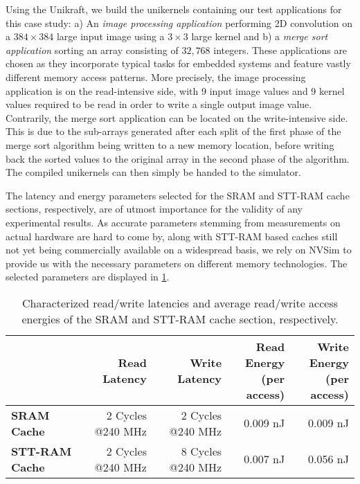 \par
Using the Unikraft, we build the unikernels containing our test applications for this case study:
a) An \emph{image processing application} performing 2D convolution on a $384 \times 384$ large input image using a $3 \times 3$ large kernel and
b) a \emph{merge sort application} sorting an array consisting of $32,768$ integers.
These applications are chosen as they incorporate typical tasks for embedded systems and feature vastly different memory access patterns.
More precisely, the image processing application is on the read-intensive side, with 9 input image values and 9 kernel values required to be read in order to write a single output image value.
Contrarily, the merge sort application can be located on the write-intensive side.
This is due to the sub-arrays generated after each split of the first phase of the merge sort algorithm being written to a new memory location, before writing back the sorted values to the original array in the second phase of the algorithm.
The compiled unikernels can then simply be handed to the simulator.
\par
The latency and energy parameters selected for the SRAM and STT-RAM cache sections, respectively, are of utmost importance for the validity of any experimental results.
As accurate parameters stemming from measurements on actual hardware are hard to come by, along with STT-RAM based caches still not yet being commercially available on a widespread basis, we rely on NVSim \cite{6218223} to provide us with the necessary parameters on different memory technologies.
The selected parameters are displayed in \cref{tab:FAU-param}.
\begin{table}
\renewcommand{\cellalign}{cr}
\begin{tabular}{lrrrr}
\toprule
		& \textbf{Read Latency} &  \textbf{Write Latency} & \makecell{\textbf{Read Energy}\\\textbf{(per access)}} & \makecell{\textbf{Write Energy}\\\textbf{(per access)}}\\ \midrule
\textbf{SRAM Cache} & 2 Cycles @240 MHz & 2 Cycles @240 MHz & 0.009 nJ & 0.009 nJ\\
\textbf{STT-RAM Cache} & 2 Cycles @240 MHz & 8 Cycles @240 MHz & 0.007 nJ & 0.056 nJ\\
\bottomrule
\end{tabular}
\caption{Characterized read/write latencies and average read/write access energies of the SRAM and STT-RAM cache section, respectively.}
\label{tab:FAU-param}
\end{table}
